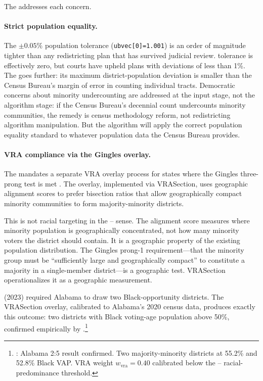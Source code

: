 The \dia{} addresses each concern.

\paragraph{Strict population equality.}
The $\pm 0.05\%$ population tolerance (\texttt{ubvec[0]=1.001}) is an
order of magnitude tighter than any redistricting plan that has survived
judicial review.
\karcher{} tolerance is effectively zero, but courts have upheld plans
with deviations of less than 1\%.
The \dia{} goes further: its maximum district-population deviation is
smaller than the Census Bureau's margin of error in counting individual tracts.
Democratic concerns about minority undercounting are addressed at the
input stage, not the algorithm stage: if the Census Bureau's decennial count
undercounts minority communities, the remedy is census methodology reform,
not redistricting algorithm manipulation.
But the algorithm will apply the correct population equality standard to
whatever population data the Census Bureau provides.

\paragraph{VRA compliance via the Gingles overlay.}
The \dia{} mandates a separate VRA overlay process for states where the
Gingles three-prong test is met \citep{b14paper}.
The overlay, implemented via VRASection, uses geographic alignment scores
to prefer bisection ratios that allow geographically compact minority
communities to form majority-minority districts.

This is not racial targeting in the \shaw{}--\miller{} sense.
The alignment score measures where minority population is geographically
concentrated, not how many minority voters the district should contain.
It is a geographic property of the existing population distribution.
The Gingles prong-1 requirement---that the minority group must be
``sufficiently large and geographically compact'' to constitute a majority
in a single-member district---is a geographic test.
VRASection operationalizes it as a geographic measurement.

\allenmilligan{} (2023) required Alabama to draw two Black-opportunity
districts.
The VRASection overlay, calibrated to Alabama's 2020 census data, produces
exactly this outcome: two districts with Black voting-age population
above 50\%, confirmed empirically by \citet{b14paper}.\footnote{%
  \citet{b14paper}: Alabama 2:5 result confirmed.
  Two majority-minority districts at 55.2\% and 52.8\% Black VAP.
  VRA weight $w_\text{vra} = 0.40$ calibrated below the \shaw{}--\miller{}
  racial-predominance threshold.
}

